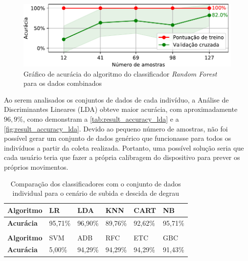 \begin{figure}[ht]
	\caption{\label{fig:result_accuracy_rfc}Gráfico de acurácia do algoritmo do classificador \textit{Random Forest} para os dados combinados}
	\begin{center}
	    \includegraphics[width=\textwidth]{resources/result_accuracy_rfc}
	\end{center}
\end{figure}

Ao serem analisados os conjuntos de dados de cada indivíduo, a Análise de Discriminantes Lineares (LDA) \cite{scikit:lda} obteve maior acurácia, com aproximadamente \(96{,}9\%\), como demonstram a \autoref{tab:result_accuracy_lda} e a \autoref{fig:result_accuracy_lda}. Devido ao pequeno número de amostras, não foi possível gerar um conjunto de dados genérico que funcionasse para todos os indivíduos a partir da coleta realizada. Portanto, uma possível solução seria que cada usuário teria que fazer a própria calibragem do dispositivo para prever os próprios movimentos.

\begin{table}[ht]
\caption{Comparação dos classificadores com o conjunto de dados individual para o cenário de subida e descida de degrau}
\label{tab:result_accuracy_lda}
\begin{tabularx}{\textwidth}{|X|X|X|X|X|X|}
\hline
\textbf{Algoritmo} & LR      & LDA     & KNN     & CART    & NB      \\ \hline
\textbf{Acurácia}  & 95,71\% & 96,90\% & 89,76\% & 92,62\% & 95,71\% \\ \hline
                   &         &         &         &         &         \\ \hline
\textbf{Algoritmo} & SVM     & ADB     & RFC     & ETC     & GBC     \\ \hline
\textbf{Acurácia}  & 5,00\%  & 94,29\% & 94,29\% & 94,29\% & 91,43\% \\ \hline
\end{tabularx}
\end{table}

